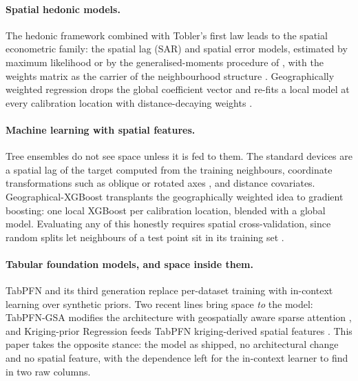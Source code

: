 \documentclass[11pt,a4paper]{article}
\begin{document}
\paragraph{Spatial hedonic models.} The hedonic framework \citep{rosen1974} combined with
Tobler's first law \citep{tobler1970} leads to the spatial econometric family: the spatial lag
(SAR) and spatial error models, estimated by maximum likelihood or by the generalised-moments
procedure of \citet{kelejian1998}, with the weights matrix as the carrier of the neighbourhood
structure \citep{anselin1988,lesage2009}. Geographically weighted regression drops the global
coefficient vector and re-fits a local model at every calibration location with
distance-decaying weights \citep{fotheringham2002}.

\paragraph{Machine learning with spatial features.} Tree ensembles do not see space unless it is
fed to them. The standard devices are a spatial lag of the target computed from the training
neighbours, coordinate transformations such as oblique or rotated axes \citep{moller2020}, and
distance covariates. Geographical-XGBoost \citep{grekousis2025} transplants the geographically
weighted idea to gradient boosting: one local XGBoost per calibration location, blended with a
global model. Evaluating any of this honestly requires spatial cross-validation, since random
splits let neighbours of a test point sit in its training set
\citep{roberts2017,meyer2022}.

\paragraph{Tabular foundation models, and space inside them.} TabPFN
\citep{hollmann2023tabpfn,hollmann2025nature} and its third generation
\citep{priorlabs2026tabpfn3,priorlabs2026tabpfn35} replace per-dataset training with in-context
learning over synthetic priors. Two recent lines bring space \emph{to} the model:
TabPFN-GSA modifies the architecture with geospatially aware sparse attention
\citep{deng2026gsa}, and Kriging-prior Regression feeds TabPFN kriging-derived spatial features
\citep{schmidinger2026kpr}. This paper takes the opposite stance: the model as shipped, no
architectural change and no spatial feature, with the dependence left for the in-context learner
to find in two raw columns.
\end{document}
